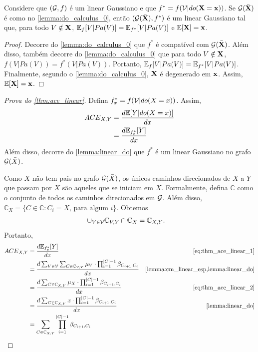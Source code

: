 \begin{lemma}
 \label{lemma:linear_do}
 Considere que $({\mathcal G},f)$ é 
 um \CM linear Gaussiano e que
 $f^* = f({\mathcal V}|do({\mathbf{X}}={\mathbf{x}}))$.
 Se ${\mathcal G}(\bar{{\mathbf{X}}})$ é 
 como no \cref{lemma:do_calculus_0}, então
 $({\mathcal G}(\bar{{\mathbf{X}}}),f^*)$ é
 um \CM linear Gaussiano tal que,
 para todo $V \notin {\mathbf{X}}$,
 ${\mathbb E}_f[V|Pa(V)] = {\mathbb E}_{f^{*}}[V|Pa(V)]$ e
 ${\mathbb E}[{\mathbf{X}}] = {\mathbf{x}}$.
\end{lemma}

\begin{proof}
 Decorre do \cref{lemma:do_calculus_0} que
 $f^*$ é compatível com ${\mathcal G}(\bar{{\mathbf{X}}})$.
 Além disso, também 
 decorre do \cref{lemma:do_calculus_0} que
 para todo $V \notin {\mathbf{X}}$,
 $f(V|Pa(V)) = f^*(V|Pa(V))$. Portanto,
 ${\mathbb E}_f[V|Pa(V)] = {\mathbb E}_{f^{*}}[V|Pa(V)]$.
 Finalmente, segundo o \cref{lemma:do_calculus_0},
 ${\mathbf{X}}$ é degenerado em ${\mathbf{x}}$. 
 Assim, ${\mathbb E}[{\mathbf{X}}] = {\mathbf{x}}$.
\end{proof}

\begin{proof}[Prova do \cref{thm:ace_linear}]
 Defina $f^*_x = f({\mathcal V}|do(X=x))$. Assim,
 \begin{align}
  \label{eq:thm_ace_linear_1}
  {ACE}_{X,Y}
  &= \frac{d{\mathbb E}[Y|do(X=x)]}{dx} 
  \nonumber \\
  &= \frac{d{\mathbb E}_{f^*_x}[Y]}{dx}
 \end{align}
 Além disso, decorre do \cref{lemma:linear_do} que
 $f^*$ é um \CM linear Gaussiano
 no grafo ${\mathcal G}(\bar{X})$.
 
 Como $X$ não tem pais no grafo ${\mathcal G}(\bar{X})$,
 os únicos caminhos direcionados de $X$ a $Y$ que 
 passam por $X$ são aqueles que se iniciam em $X$.
 Formalmente, defina $\mathbb{C}$ como o conjunto de 
 todos os caminhos direcionados em ${\mathcal G}$.
 Além disso, $\mathbb{C}_{X} = 
 \{C \in \mathbb{C}: C_i = X \text{, para algum } i\}$. 
 Obtemos
 \begin{align}
  \label{eq:thm_ace_linear_2}
  \cup_{V \in {\mathcal V}} \mathbb{C}_{V,Y} \cap \mathbb{C}_X 
  &= \mathbb{C}_{X,Y}.
 \end{align}
 Portanto,
 \begin{align*}
  \ACE_{X,Y}
  &= \frac{d\E_{f^*_x}[Y]}{dx}
  & \text{\cref{eq:thm_ace_linear_1}} \\
  &= \frac{d \sum_{V \in \mathbb{\sV}} 
  \sum_{C \in \mathbb{C}_{V,Y}}
  \mu_V \cdot \prod_{i=1}^{|C|-1} \beta_{C_{i+1},C_i}}{dx}
  & \text{\cref{lemma:cm_linear_esp,lemma:linear_do}} \\
  &= \frac{d \sum_{C \in \mathbb{C}_{X,Y}}
  \mu_X \cdot \prod_{i=1}^{|C|-1} \beta_{C_{i+1},C_i}}{dx}
  & \text{\cref{eq:thm_ace_linear_2}} \\
  &= \frac{d \sum_{C \in \mathbb{C}_{X,Y}}
  x \cdot \prod_{i=1}^{|C|-1} \beta_{C_{i+1},C_i}}{dx}
  & \text{\cref{lemma:linear_do}} \\
  &= \sum_{C \in \mathbb{C}_{X,Y}} \prod_{i=1}^{|C|-1} \beta_{C_{i+1},C_i}
 \end{align*}
\end{proof}

